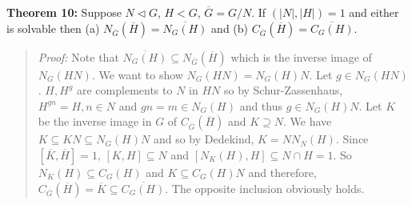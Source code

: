 {\bf Theorem 10:}  Suppose $N \lhd G$, $H < G$, ${\overline G}= G/N$.  If $(|N|, |H|)=1$
and either is solvable then (a) $N_{{\overline G}}({\overline H}) = {\overline {N_G(H)}}$ and
(b) $C_{{\overline G}}({\overline H}) = {\overline {C_G(H)}}$.
\begin{quote}
\emph{Proof:} Note that ${\overline {N_G(H)}} \subseteq N_{\overline G}({\overline H})$ which is the
inverse image of $N_G(HN)$.  We want to show $N_G(HN)= N_G(H)N$.
Let $g \in N_G(HN)$.  $H, H^g$ are complements to $N$ in $HN$ so by Schur-Zassenhaus,
$H^{gn}=H, n \in N$ and $gn=m \in N_G(H)$ and thus $g \in N_G(H)N$.  Let $K$ be the
inverse image in $G$ of $C_{\overline G}({\overline H})$ and $K \supseteq N$.
We have $K \subseteq KN \subseteq N_G(H)N$ and so by Dedekind, $K=N N_N(H)$.
Since $[ {\overline K}, {\overline H}]= 1$, $[K, H] \subseteq N$ and
$[N_K(H), H] \subseteq N \cap H = 1$.  So $N_K(H) \subseteq C_G(H)$ and
$K \subseteq C_G(H)N$ and therefore,
$C_{\overline G}({\overline H})= {\overline K} \subseteq {\overline {C_G(H)}}$.  The
opposite inclusion obviously holds.
\end{quote}
